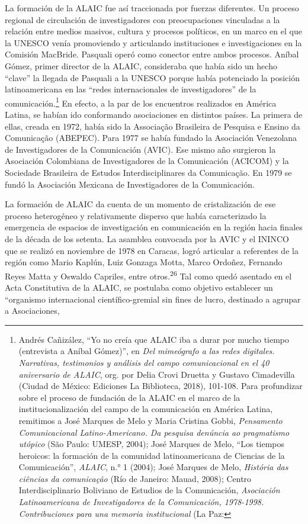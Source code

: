 \documentclass{tufte-handout}
\begin{document}
La formación de la ALAIC fue así traccionada por fuerzas diferentes. Un
proceso regional de circulación de investigadores con preocupaciones
vinculadas a la relación entre medios masivos, cultura y procesos
políticos, en un marco en el que la UNESCO venía promoviendo y
articulando instituciones e investigaciones en la Comisión MacBride.
Pasquali operó como conector entre ambos procesos. Aníbal Gómez, primer
director de la ALAIC, consideraba que había sido un hecho ``clave'' la
llegada de Pasquali a la UNESCO porque había potenciado la posición
latinoamericana en las ``redes internacionales de investigadores'' de la
comunicación.\footnote{Andrés Cañizález, ``Yo no creía que ALAIC iba a
  durar por mucho tiempo (entrevista a Aníbal Gómez)'', en \emph{Del
  mimeógrafo a las redes digitales. Narrativas, testimonios y análisis
  del campo comunicacional en el 40 aniversario de ALAIC}, org. por
  Delia Crovi Druetta y Gustavo Cimadevilla (Ciudad de México: Ediciones
  La Biblioteca, 2018), 101-108. Para profundizar sobre el proceso de
  fundación de la ALAIC en el marco de la institucionalización del campo
  de la comunicación en América Latina, remitimos a José Marques de Melo
  y Maria Cristina Gobbi, \emph{Pensamento Comunicacional
  Latino-Americano. Da pesquisa denúncia ao pragmatismo utópico} (São
  Paulo: UMESP, 2004); José Marques de Melo, ``Los tiempos heroicos: la
  formación de la comunidad latinoamericana de Ciencias de la
  Comunicación'', \emph{ALAIC}, n.° 1 (2004); José Marques de Melo,
  \emph{História das ciências da comunicação} (Río de Janeiro: Mauad,
  2008); Centro Interdisciplinario Boliviano de Estudios de la
  Comunicación, \emph{Asociación Latinoamericana de Investigadores de la
  Comunicación, 1978-1998. Contribuciones para una memoria
  institucional} (La Paz:} En efecto, a la par de los
encuentros realizados en América Latina, se habían ido conformando
asociaciones en distintos países. La primera de ellas, creada en 1972,
había sido la Associação Brasileira de Pesquisa e Ensino da Comunicação
(ABEPEC). Para 1977 se había fundado la Asociación Venezolana de
Investigadores de la Comunicación (AVIC). Ese mismo año surgieron la
Asociación Colombiana de Investigadores de la Comunicación (ACICOM) y la
Sociedade Brasileira de Estudos Interdisciplinares da Comunicação. En
1979 se fundó la Asociación Mexicana de Investigadores de la
Comunicación.

La formación de ALAIC da cuenta de un momento de cristalización de ese
proceso heterogéneo y relativamente disperso que había caracterizado la
emergencia de espacios de investigación en comunicación en la región
hacia finales de la década de los setenta. La asamblea convocada por la
AVIC y el ININCO que se realizó en noviembre de 1978 en Caracas, logró
articular a referentes de la región como Mario Kaplún, Luiz Gonzaga
Motta, Marco Ordoñez, Fernando Reyes Matta y Oswaldo Capriles, entre
otros.\textsuperscript{26} Tal como quedó asentado en el Acta
Constitutiva de la ALAIC, se postulaba como objetivo establecer un
``organismo internacional científico-gremial sin fines de lucro,
destinado a agrupar a Asociaciones,\newpage 
\end{document}
